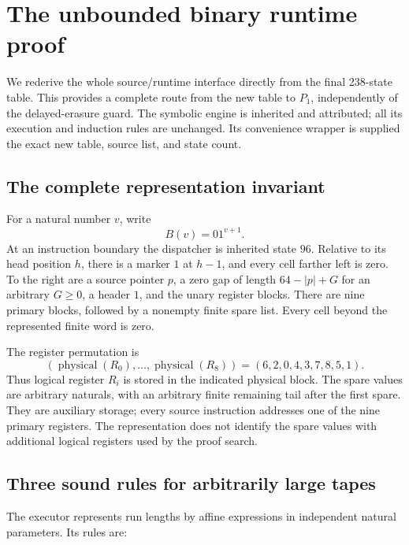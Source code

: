 \section{The unbounded binary runtime proof}
\label{sec:runtime}

We rederive the whole source/runtime interface directly from the final
238-state table. This provides a complete route from the new table to
$P_1$, independently of the delayed-erasure guard. The symbolic engine
is inherited and attributed; all its execution and induction rules are
unchanged. Its convenience wrapper is supplied the exact new table,
source list, and state count.

\subsection{The complete representation invariant}

For a natural number $v$, write
\[
                       B(v)=01^{v+1}.
\]
At an instruction boundary the dispatcher is inherited state $96$.
Relative to its head position $h$, there is a marker $1$ at $h-1$,
and every cell farther left is zero. To the right are a source pointer
$p$, a zero gap of length $64-|p|+G$ for an arbitrary $G\ge0$, a
header $1$, and the unary register blocks. There are nine primary
blocks, followed by a nonempty finite spare list. Every cell beyond
the represented finite word is zero.

The register permutation is
\[
 (\operatorname{physical}(R_0),\ldots,\operatorname{physical}(R_8))
                         =(6,2,0,4,3,7,8,5,1).
\]
Thus logical register $R_i$ is stored in the indicated physical block.
The spare values are arbitrary naturals, with an arbitrary finite
remaining tail after the first spare. They are auxiliary storage;
every source instruction addresses one of the nine primary registers.
The representation does not identify the spare values with additional
logical registers used by the proof search.

\subsection{Three sound rules for arbitrarily large tapes}

The executor represents run lengths by affine expressions in independent
natural parameters. Its rules are:

